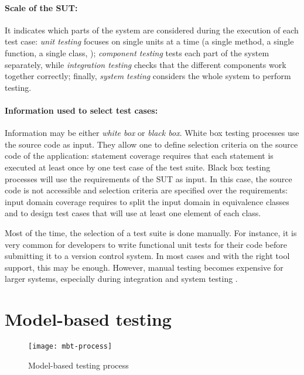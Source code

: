 \paragraph{Scale of the SUT:} 
%
It indicates which parts of the system are considered during the execution of each test case: \emph{unit testing} focuses on single units at a time (\eg a single method, a single function, a single class, \etc); \emph{component testing} tests each part of the system separately, while \emph{integration testing} checks that the different components work together correctly; finally, \emph{system testing} considers the whole system to perform testing.

\paragraph{Information used to select test cases:} 
%
Information may be either \emph{white box} or \emph{black box}. White box testing processes use the source code as input. They allow one to define selection criteria on the source code of the application: \eg statement coverage requires that each statement is executed at least once by one test case of the test suite. Black box testing processes will use the requirements of the SUT as input. In this case, the source code is not accessible and selection criteria are specified over the requirements: \eg input domain coverage requires to split the input domain in equivalence classes and to design test cases that will use at least one element of each class.

Most of the time, the selection of a test suite is done manually. For instance, it is very common for developers to write functional unit tests for their code before submitting it to a version control system. In most cases and with the right tool support, this may be enough. However, manual testing becomes expensive for larger systems, especially during integration and system testing \cite{Utting2007}. 

\section{Model-based testing}

\label{sec:mbt}

\begin{figure}
	\centering
	\texttt{[image: mbt-process]}
	\caption{Model-based testing process}
	\label{fig:mbtprocess}
\end{figure}

